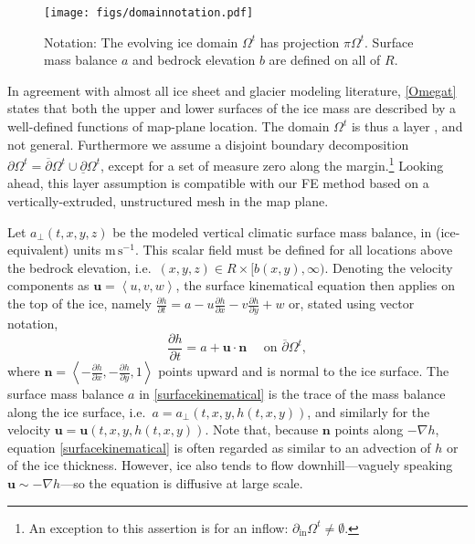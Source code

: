 \documentclass[letterpaper,final,12pt,reqno]{amsart}
\newcommand{\grad}{\nabla}
\newcommand{\bn}{\mathbf{n}}
\newcommand{\bu}{\mathbf{u}}
\begin{document}
\begin{figure}[ht]
\begin{center}
\texttt{[image: figs/domainnotation.pdf]}
\end{center}
\caption{Notation: The evolving ice domain $\Omega^t$ has projection $\pi \Omega^t$.  Surface mass balance $a$ and bedrock elevation $b$ are defined on all of $R$.}
\label{fig:domainnotation}
\end{figure}

In agreement with almost all ice sheet and glacier modeling literature, \eqref{Omegat} states that both the upper and lower surfaces of the ice mass are described by a well-defined functions of map-plane location.  The domain $\Omega^t$ is thus a layer \cite{Bueler2020}, and not general.  Furthermore we assume a disjoint boundary decomposition $\partial \Omega^t = \overline{\partial} \Omega^t \cup \underline{\partial} \Omega^t$, except for a set of measure zero along the margin.\footnote{An exception to this assertion is for an inflow: $\partial_{\text{in}} \Omega^t \ne \emptyset$.}  Looking ahead, this layer assumption is compatible with our FE method based on a vertically-extruded, unstructured mesh in the map plane.

Let $a_\perp(t,x,y,z)$ be the modeled vertical climatic surface mass balance, in (ice-equivalent) units $\text{m}\,\text{s}^{-1}$.  This scalar field must be defined for all locations above the bedrock elevation, i.e.~$(x,y,z) \in R\times[b(x,y),\infty)$.  Denoting the velocity components as $\bu=\left<u,v,w\right>$, the surface kinematical equation \cite{GreveBlatter2009} then applies on the top of the ice, namely $\frac{\partial h}{\partial t} = a - u \frac{\partial h}{\partial x} - v \frac{\partial h}{\partial y} + w$ or, stated using vector notation,
\begin{equation}
\frac{\partial h}{\partial t} = a + \bu \cdot \bn \quad \text{ on } \overline{\partial}\Omega^t, \label{surfacekinematical}
\end{equation}
where $\bn = \left<-\frac{\partial h}{\partial x},-\frac{\partial h}{\partial y},1\right>$ points upward and is normal to the ice surface.  The surface mass balance $a$ in \eqref{surfacekinematical} is the trace \cite{Evans2010} of the mass balance along the ice surface, i.e.~$a = a_{\perp}(t,x,y,h(t,x,y))$, and similarly for the velocity $\bu = \bu(t,x,y,h(t,x,y))$.  Note that, because $\bn$ points along $-\grad h$, equation \eqref{surfacekinematical} is often regarded as similar to an advection of $h$ or of the ice thickness.  However, ice also tends to flow downhill---vaguely speaking $\bu \sim -\grad h$---so the equation is diffusive at large scale.
\end{document}
